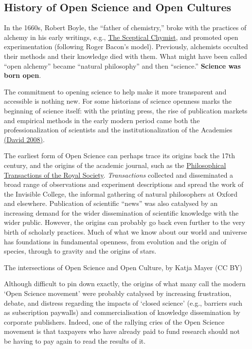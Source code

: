 \documentclass[]{book}
\begin{document}
{{\hypertarget{history-of-open-science-and-open-cultures}{%
\subsection{History of Open Science and Open Cultures }\label{history-of-open-science-and-open-cultures}}

In the 1660s, Robert Boyle, the ``father of chemistry,'' broke with the practices of alchemy in his early writings, e.g., \href{https://en.wikipedia.org/wiki/The_Sceptical_Chymist}{The Sceptical Chymist}, and promoted open experimentation (following Roger Bacon's model). Previously, alchemists occulted their methods and their knowledge died with them. What might have been called ``open alchemy'' became ``natural philosophy'' and then ``science.'' \textbf{Science was born open}.

The commitment to opening science to help make it more transparent and accessible is nothing new. For some historians of science openness marks the beginning of science itself: with the printing press, the rise of publication markets and empirical methods in the early modern period came both the professionalization of scientists and the institutionalization of the Academies \href{https://ssrn.com/abstract=2209188}{(David 2008)}.

The earliest form of Open Science can perhaps trace its origins back the 17th century, and the origins of the academic journal, such as the \href{https://en.wikipedia.org/wiki/Philosophical_Transactions_of_the_Royal_Society}{Philosophical Transactions of the Royal Society}. \emph{Transactions} collected and disseminated a broad range of observations and experiment descriptions and spread the work of the Invisible College, the informal gathering of natural philosophers at Oxford and elsewhere. Publication of scientific ``news'' was also catalysed by an increasing demand for the wider dissemination of scientific knowledge with the wider public. However, the origins can probably go back even further to the very birth of scholarly practices. Much of what we know about our world and universe has foundations in fundamental openness, from evolution and the origin of species, through to gravity and the origins of stars.

The intersections of Open Science and Open Culture, by Katja Mayer (CC BY)

Although difficult to pin down exactly, the origins of what many call the modern `Open Science movement' were probably catalysed by increasing frustration, debate, and distress regarding the impacts of `closed science' (e.g., barriers such as subscription paywalls) and commercialisation of knowledge dissemination by corporate publishers. Indeed, one of the rallying cries of the Open Science movement is that taxpayers who have already paid to fund research should not be having to pay again to read the results of it.

}}
\end{document}
